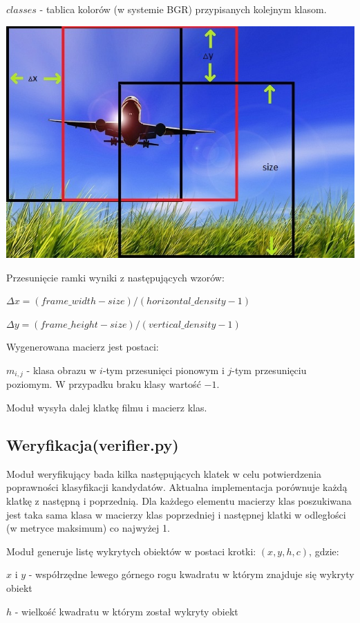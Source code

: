 \documentclass[10pt,a4paper]{article}
\begin{document}
$classes$ - tablica kolorów (w systemie BGR) przypisanych kolejnym klasom.

\includegraphics[scale=0.8]{lot.jpg}

Przesunięcie ramki wyniki z następujących wzorów:

$\Delta x = (frame\_width- size)/(horizontal\_density-1)$

$\Delta y = (frame\_height - size)/(vertical\_density-1)$

Wygenerowana macierz jest postaci:

$m_{i,j}$ - klasa obrazu w $i$-tym przesunięci pionowym i $j$-tym przesunięciu poziomym. W przypadku braku klasy wartość $-1$.

Moduł wysyła dalej klatkę filmu i macierz klas.

\subsection{Weryfikacja(verifier.py)}

Moduł weryfikujący bada kilka następujących klatek w celu potwierdzenia poprawności klasyfikacji kandydatów. Aktualna implementacja porównuje każdą klatkę z następną i poprzednią. Dla każdego elementu macierzy klas poszukiwana jest taka sama klasa w macierzy klas poprzedniej i następnej klatki w odległości (w metryce maksimum) co najwyżej 1.

Moduł generuje listę wykrytych obiektów w postaci krotki: $(x, y, h, c)$,
gdzie:

$x$ i $y$ - współrzędne lewego górnego rogu kwadratu w którym znajduje się wykryty obiekt

$h$ - wielkość kwadratu w którym został wykryty obiekt
\end{document}
